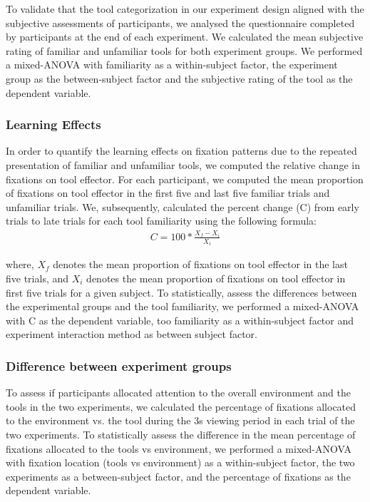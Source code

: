 To validate that the tool categorization in our experiment design aligned with the subjective assessments of participants, we analysed the questionnaire completed by participants at the end of each experiment. We calculated the mean subjective rating of familiar and unfamiliar tools for both experiment groups. We performed a mixed-ANOVA with familiarity as a within-subject factor, the experiment group as the between-subject factor and the subjective rating of the tool as the dependent variable.

\subsubsection{Learning Effects}

In order to quantify the learning effects on fixation patterns due to the repeated presentation of familiar and unfamiliar tools, we computed the relative change in fixations on tool effector. For each participant, we computed the mean proportion of fixations on tool effector in the first five and last five familiar trials and unfamiliar trials. We, subsequently, calculated the percent change (C) from early trials to late trials for each tool familiarity using the following formula:
\begin{gather*}\label{eq:learning effect}
C =  100*\frac{X_f - X_i}{X_i}
 \end{gather*}
 
where, $X_f$ denotes the mean proportion of fixations on tool effector in the last five trials, and $X_i$ denotes the mean proportion of fixations on tool effector in first five trials for a given subject. To statistically, assess the differences between the experimental groups and the tool familiarity, we performed a mixed-ANOVA with C as the dependent variable, too familiarity as a within-subject factor and experiment interaction method as between subject factor.

\subsubsection{Difference between experiment groups}

To assess if participants allocated attention to the overall environment and the tools in the two experiments, we calculated the percentage of fixations allocated to the environment vs. the tool during the 3s viewing period in each trial of the two experiments. To statistically assess the difference in the mean percentage of fixations allocated to the tools vs environment, we performed a mixed-ANOVA with fixation location (tools vs environment) as a within-subject factor, the two experiments as a between-subject factor, and the percentage of fixations as the dependent variable. 